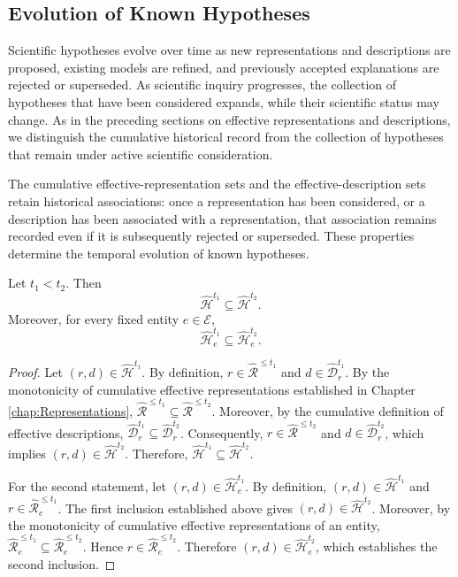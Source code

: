 
\subsection*{Evolution of Known Hypotheses}

Scientific hypotheses evolve over time as new representations and descriptions are proposed, existing models are refined, and previously accepted explanations are rejected or superseded. As scientific inquiry progresses, the collection of hypotheses that have been considered expands, while their scientific status may change. As in the preceding sections on effective representations and descriptions, we distinguish the cumulative historical record from the collection of hypotheses that remain under active scientific consideration.

The cumulative effective-representation sets and the effective-description sets retain historical associations: once a representation has been considered, or a description has been associated with a representation, that association remains recorded even if it is subsequently rejected or superseded. These properties determine the temporal evolution of known hypotheses.

\begin{proposition}
\label{prop:known_hypotheses_monotonic}
Let $t_1<t_2$. Then
\[
\hat{\mathcal{H}}^{t_1} \subseteq \hat{\mathcal{H}}^{t_2}.
\]
Moreover, for every fixed entity $e\in\mathcal{E}$,
\[
\hat{\mathcal{H}}_e^{t_1} \subseteq \hat{\mathcal{H}}_e^{t_2}.
\]
\end{proposition}
\begin{proof}
Let $(r,d)\in\hat{\mathcal{H}}^{t_1}$. By definition, $r\in\hat{\mathcal{R}}^{\leq t_1}$ and $d\in\hat{\mathcal{D}}_r^{t_1}$. By the monotonicity of cumulative effective representations established in Chapter \ref{chap:Representations}, $\hat{\mathcal{R}}^{\leq t_1} \subseteq\hat{\mathcal{R}}^{\leq t_2}$. Moreover, by the cumulative definition of effective descriptions, $\hat{\mathcal{D}}_r^{t_1} \subseteq\hat{\mathcal{D}}_r^{t_2}$. Consequently, $r\in\hat{\mathcal{R}}^{\leq t_2}$ and $d\in\hat{\mathcal{D}}_r^{t_2}$, which implies $(r,d)\in\hat{\mathcal{H}}^{t_2}$. Therefore, $\hat{\mathcal{H}}^{t_1} \subseteq\hat{\mathcal{H}}^{t_2}$.

For the second statement, let $(r,d)\in\hat{\mathcal{H}}_e^{t_1}$. By definition, $(r,d)\in\hat{\mathcal{H}}^{t_1}$ and $r\in\hat{\mathcal{R}}_e^{\leq t_1}$. The first inclusion established above gives $(r,d)\in\hat{\mathcal{H}}^{t_2}$. Moreover, by the monotonicity of cumulative effective representations of an entity, $\hat{\mathcal{R}}_e^{\leq t_1} \subseteq\hat{\mathcal{R}}_e^{\leq t_2}$. Hence $r\in\hat{\mathcal{R}}_e^{\leq t_2}$. Therefore $(r,d)\in\hat{\mathcal{H}}_e^{t_2}$, which establishes the second inclusion.
\end{proof}


